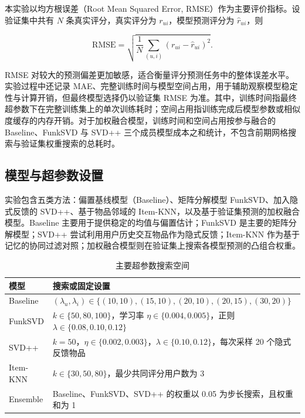 \documentclass[UTF8,a4paper,10pt]{ctexart}
\begin{document}
本实验以均方根误差（Root Mean Squared Error, RMSE）作为主要评价指标。设验证集中共有 $N$ 条真实评分，真实评分为 $r_{ui}$，模型预测评分为 $\hat{r}_{ui}$，则

\[
    \mathrm{RMSE} =
    \sqrt{
        \frac{1}{N}
        \sum_{(u,i)}
        \left(r_{ui} - \hat{r}_{ui}\right)^2
    }.
\]

RMSE 对较大的预测偏差更加敏感，适合衡量评分预测任务中的整体误差水平。实验过程中还记录 MAE、完整训练时间与模型空间占用，用于辅助观察模型稳定性与计算开销，但最终模型选择仍以验证集 RMSE 为准。其中，训练时间指最终超参数下在完整训练集上的单次训练耗时；空间占用指训练完成后模型参数或相似度缓存的内存开销。对于加权融合模型，训练时间和空间占用按参与融合的 Baseline、FunkSVD 与 SVD++ 三个成员模型成本之和统计，不包含前期网格搜索与验证集权重搜索的总耗时。

\subsection{模型与超参数设置}

实验包含五类方法：偏置基线模型（Baseline）、矩阵分解模型 FunkSVD、加入隐式反馈的 SVD++、基于物品邻域的 Item-KNN，以及基于验证集预测的加权融合模型。Baseline 主要用于提供稳定的均值与偏置估计；FunkSVD 是主要的矩阵分解模型；SVD++ 尝试利用用户历史交互物品作为隐式反馈；Item-KNN 作为基于记忆的协同过滤对照；加权融合模型则在验证集上搜索各模型预测的凸组合权重。

\begin{table}[H]
    \centering
    \caption{主要超参数搜索空间}
        \renewcommand{\arraystretch}{1.2}
    \label{tab:param_space}
    \small
    \begin{tabular}{@{}ll@{}}
        \toprule
        \textbf{模型} & \textbf{搜索或固定设置} \\
        \midrule
        Baseline & $(\lambda_u,\lambda_i)\in\{(10,10),(15,10),(20,10),(20,15),(30,20)\}$ \\
        FunkSVD & $k\in\{50,80,100\}$，学习率 $\eta\in\{0.004,0.005\}$，正则 $\lambda\in\{0.08,0.10,0.12\}$ \\
        SVD++ & $k=50$，$\eta\in\{0.002,0.003\}$，$\lambda\in\{0.10,0.12\}$，每次采样 20 个隐式反馈物品 \\
        Item-KNN & $k\in\{30,50,80\}$，最少共同评分用户数为 3 \\
        Ensemble & Baseline、FunkSVD、SVD++ 的权重以 0.05 为步长搜索，且权重和为 1 \\
        \bottomrule
    \end{tabular}
\end{table}
\end{document}

